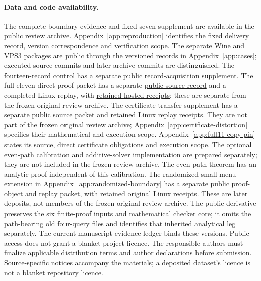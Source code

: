 \documentclass[pdflatex,sn-mathphys-num]{sn-jnl}
\theoremstyle{thmstyleone}
\theoremstyle{thmstylethree}
\theoremstyle{thmstyletwo}
\begin{document}
\paragraph*{Data and code availability.}
The complete boundary evidence and fixed-seven supplement are available in the \href{https://github.com/SHiJiE1115/newproj/releases/tag/complete-six-review-20261011-v01}{public review archive}. Appendix~\ref{app:reproduction} identifies the fixed delivery record, version correspondence and verification scope. The separate Wine and VPS3 packages are public through the versioned records in Appendix~\ref{app:cases}; executed source commits and later archive commits are distinguished. The fourteen-record control has a separate \href{https://github.com/SHiJiE1115/newproj/tree/78da45ebeff7e74d0cb080114f30172fac3f09f8/theory/record_acquisition_v01}{public record-acquisition supplement}. The full-eleven direct-proof packet has a separate \href{https://github.com/SHiJiE1115/newproj/tree/37b10299e6abb9ba260012b24fc244ee90fb94d9/theory/full11_direct_v01}{public source record} and a completed Linux replay, with \href{https://github.com/SHiJiE1115/newproj/tree/cba5d748dfc44d285c44396a01af4098d4b9201d/evidence/full11_hosted_v01}{retained hosted receipts}; these are separate from the frozen original review archive. The certificate-transfer supplement has a separate \href{https://github.com/SHiJiE1115/newproj/tree/a420cd488ca63bfca0a857a103e4c85793269353/theory/certificate_transfer_v01}{public source packet} and \href{https://github.com/SHiJiE1115/newproj/tree/f68a04d13e7b082a651866ecd518c7199aac30a5/evidence/certificate_completion_hosted_v01}{retained Linux replay receipts}. They are not part of the frozen original review archive; Appendix~\ref{app:certificate-distortion} specifies their mathematical and execution scope. Appendix~\ref{app:full11-copy-pin} states its source, direct certificate obligations and execution scope. The optional even-path calibration and additive-solver implementation are prepared separately; they are not included in the frozen review archive. The even-path theorem has an analytic proof independent of this calibration. The randomized small-menu extension in Appendix~\ref{app:randomized-boundary} has a separate \href{https://github.com/SHiJiE1115/newproj/tree/aade35dbb049f64f6a66e0db8fd79fc269fb0ba5/theory/small_menu_randomization_v01}{public proof-object and replay packet}, with \href{https://github.com/SHiJiE1115/newproj/tree/1f70f518aa56f6ed368ce8d02fab5cbeb5ee3dc9/evidence/small_menu_hosted_v01}{retained original Linux receipts}. These are later deposits, not members of the frozen original review archive. The public derivative preserves the six finite-proof inputs and mathematical checker core; it omits the path-bearing old four-query files and identifies that inherited analytical leg separately. The current manuscript evidence ledger binds these versions. Public access does not grant a blanket project licence. The responsible authors must finalize applicable distribution terms and author declarations before submission. Source-specific notices accompany the materials; a deposited dataset's licence is not a blanket repository licence.
\end{document}
